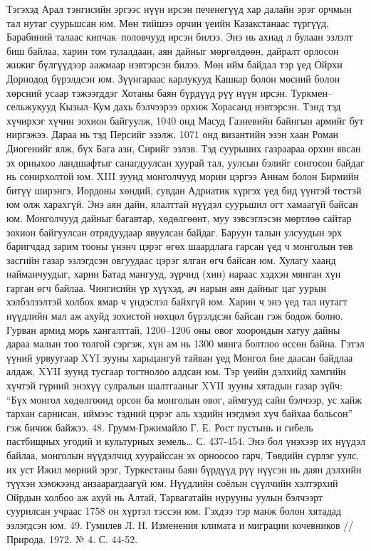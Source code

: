 Тэгэхэд Арал тэнгисийн эргээс нүүн ирсэн печенегүүд хар далайн эрэг орчмын тал нутаг суурьшсан юм. Мөн тийшээ орчин үеийн Казакстанаас түргүүд, Барабиний талаас кипчак–половчууд ирсэн билээ. Энэ нь ахиад л булаан эзлэлт биш байлаа, харин том тулалдаан, аян дайныг мөргөлдөөн, дайралт орлосон жижиг бүлгүүдээр аажмаар нэвтэрсэн билээ.
Мөн ийм байдал тэр үед Ойрхи Дорнодод бүрэлдсэн юм. Зүүнгараас карлукууд Кашкар болон мөсний болон хөрсний усаар тэжээгддэг Хотаны баян бүрдүүд рүү нүүн ирсэн. Туркмен–сельжукууд Кызыл–Кум дахь бэлчээрээ орхиж Хорасанд нэвтэрсэн. Тэнд тэд хүчирхэг хүчин зохион байгуулж, 1040 онд Масуд Газневийн байнгын армийг бут ниргэжээ. Дараа нь тэд Персийг эзэлж, 1071 онд византийн эзэн хаан Роман Диогенийг ялж, бүх Бага ази, Сирийг эзлэв. Тэд суурьших газраараа орхин явсан эх орныхоо ландшафтыг санагдуулсан хуурай тал, уулсын бэлийг сонгосон байдаг нь сонирхолтой юм.
XIII зуунд монголчууд морин цэргээ Аннам болон Бирмийн битүү ширэнгэ, Иордоны хөндий, сувдан Адриатик хүргэх үед бид үүнтэй төстэй юм олж харахгүй. Энэ аян дайн, ялалттай нүүдэл суурьшил огт хамаагүй байсан юм. Монголчууд дайныг багавтар, хөдөлгөөнт, муу зэвсэглэсэн мөртлөө сайтар зохион байгуулсан отрядуудаар явуулсан байдаг. Баруун талын улсуудын эрх баригчдад зарим тооны үнэнч цэрэг өгөх шаардлага гарсан үед ч монголын төв засгийн газар эзлэгдсэн овгуудаас цэрэг ялган өгч байсан юм. Хулагу хаанд найманчуудыг, харин Батад мангууд, зүрчид (хин) нараас хэдхэн мянган хүн гарган өгч байлаа.
Чингисийн үр хүүхэд, ач нарын аян дайныг цаг уурын хэлбэлзэлтэй холбох ямар ч үндэслэл байхгүй юм. Харин ч энэ үед тал нутагт нүүдлийн мал аж ахуйд зохистой нөхцөл бүрэлдсэн байсан гэж бодож болно. Гурван армид морь хангалттай, 1200–1206 оны овог хоорондын хатуу дайны дараа малын тоо толгой сэргэж, хүн ам нь 1300 мянга болтлоо өссөн байна. Гэтэл үүний урвуугаар XYI зууны харьцангуй тайван үед Монгол бие даасан байдлаа алдаж, XYII зуунд тусгаар тогтнолоо алдсан юм.
Тэр үеийн дэлхийд хамгийн хүчтэй гүрний энэхүү сулралын шалтгааныг XYII зууны хятадын газар зүйч: “Бүх монгол хөдөлгөөнд орсон ба монголын овог, аймгууд сайн бэлчээр, ус хайж тархан сарнисан, иймээс тэдний цэрэг аль хэдийн нэгдмэл хүч байхаа больсон” гэж бичиж байжээ. 48. Грумм-Гржимайло Г. Е. Рост пустынь и гибель пастбищных угодий и культурных земель… С. 437-454.
Энэ бол үнэхээр их нүүдэл байлаа, монголын нүүдэлчид хуурайссан эх орноосоо гарч, Төвдийн сүрлэг уулс, их уст Ижил мөрний эрэг, Туркестаны баян бүрдүүд рүү нүүсэн нь даян дэлхийн түүхэн хэмжээнд анзаарагдаагүй юм. Нүүдлийн соёлын сүүлчийн хэлтэрхий Ойрдын холбоо аж ахуй нь Алтай, Тарвагатайн нурууны уулын бэлчээрт суурилсан учраас 1758 он хүртэл тэссэн юм. Гэхдээ тэр манж болон хятадад эзлэгдсэн юм. 49. Гумилев Л. Н. Изменения климата и миграции кочевников //Природа. 1972. № 4. С. 44-52.
